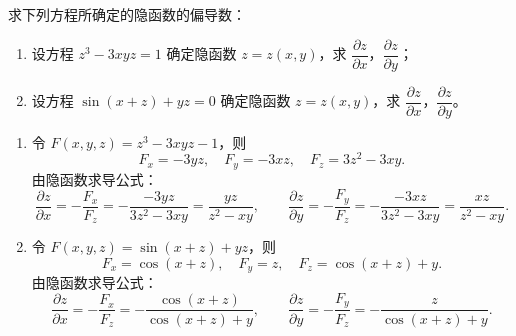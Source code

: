 \documentclass[answer]{THUExam}
\begin{document}
\begin{problem}
求下列方程所确定的隐函数的偏导数：
\begin{enumerate}
\item 设方程 $z^3-3xyz=1$ 确定隐函数 $z=z(x,y)$，求 $\dfrac{\partial z}{\partial x}$，$\dfrac{\partial z}{\partial y}$；
\item 设方程 $\sin(x+z)+yz=0$ 确定隐函数 $z=z(x,y)$，求 $\dfrac{\partial z}{\partial x}$，$\dfrac{\partial z}{\partial y}$。
\end{enumerate}
\end{problem}

\begin{solution}
\begin{enumerate}
\item 令 $F(x,y,z)=z^3-3xyz-1$，则
\[
F_x=-3yz,\quad F_y=-3xz,\quad F_z=3z^2-3xy.
\]
由隐函数求导公式：
\[
\frac{\partial z}{\partial x}=-\frac{F_x}{F_z}=-\frac{-3yz}{3z^2-3xy}=\frac{yz}{z^2-xy},
\qquad
\frac{\partial z}{\partial y}=-\frac{F_y}{F_z}=-\frac{-3xz}{3z^2-3xy}=\frac{xz}{z^2-xy}.
\]

\item 令 $F(x,y,z)=\sin(x+z)+yz$，则
\[
F_x=\cos(x+z),\quad F_y=z,\quad F_z=\cos(x+z)+y.
\]
由隐函数求导公式：
\[
\frac{\partial z}{\partial x}=-\frac{F_x}{F_z}=-\frac{\cos(x+z)}{\cos(x+z)+y},
\qquad
\frac{\partial z}{\partial y}=-\frac{F_y}{F_z}=-\frac{z}{\cos(x+z)+y}.
\]
\end{enumerate}
\end{solution}
\bigskip
\end{document}
